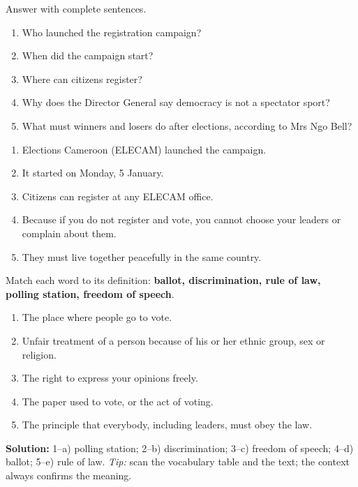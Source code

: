 \documentclass[11pt]{article}
\begin{document}
\begin{exercice}[Wh-Questions]
Answer with complete sentences.
\begin{enumerate}
\item Who launched the registration campaign?
\item When did the campaign start?
\item Where can citizens register?
\item Why does the Director General say democracy is not a spectator sport?
\item What must winners and losers do after elections, according to Mrs Ngo Bell?
\end{enumerate}
\end{exercice}

\begin{corrige}
\begin{enumerate}
\item Elections Cameroon (ELECAM) launched the campaign.
\item It started on Monday, 5 January.
\item Citizens can register at any ELECAM office.
\item Because if you do not register and vote, you cannot choose your leaders or complain about them.
\item They must live together peacefully in the same country.
\end{enumerate}
\end{corrige}

\begin{exoresolu}
Match each word to its definition: \textbf{ballot, discrimination, rule of law, polling station, freedom of speech}.
\begin{enumerate}
\item[a)] The place where people go to vote.
\item[b)] Unfair treatment of a person because of his or her ethnic group, sex or religion.
\item[c)] The right to express your opinions freely.
\item[d)] The paper used to vote, or the act of voting.
\item[e)] The principle that everybody, including leaders, must obey the law.
\end{enumerate}
\tcblower
\textbf{Solution:} 1--a) polling station; 2--b) discrimination; 3--c) freedom of speech; 4--d) ballot; 5--e) rule of law. \emph{Tip:} scan the vocabulary table and the text; the context always confirms the meaning.
\end{exoresolu}
\end{document}
